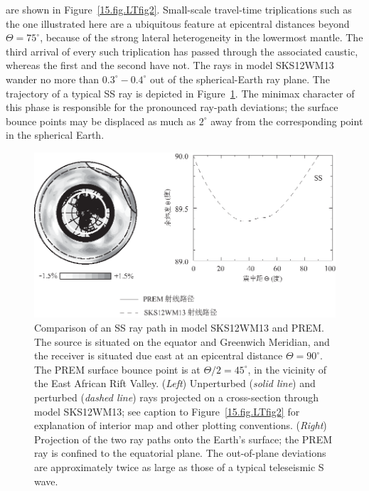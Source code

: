 are shown in Figure~\ref{15.fig.LTfig2}.  Small-scale travel-time
triplications such as the one illustrated here are a ubiquitous
feature at epicentral distances beyond $\Theta=75^{\circ}$,
because of the strong lateral heterogeneity in the lowermost
mantle.  The third arrival of every such triplication has
passed through the associated caustic, whereas the first and
the second have not.  The rays in model SKS12WM13 wander no more
than $0.3^{\circ}\!\!-\!0.4^{\circ}$ out of the spherical-Earth
ray plane.
The trajectory of a typical SS ray is depicted
in Figure~\ref{15.fig.LTfig13}.  The minimax character
%
%
of this phase is responsible for the pronounced ray-path
deviations; the surface bounce points may be displaced as
much as $2^{\circ}$ away from the corresponding point
in the spherical Earth.
\begin{figure}[!t]
\begin{center}
\includegraphics{../figures/chap15/fig07.eps}
\end{center}
\caption[liu&tromp Fig 13]
{\label{15.fig.LTfig13}
Comparison of an SS ray path in model SKS12WM13 and PREM.
The source is situated on the equator and Greenwich Meridian,
and the receiver is situated due east at an epicentral distance
$\Theta=90^{\circ}$.  The PREM surface bounce point is at
$\Theta/2=45^{\circ}$, in the vicinity of the East African Rift Valley.
({\em Left\/}) Unperturbed ({\em solid line\/}) and perturbed
({\em dashed line\/}) rays projected on a cross-section through model
SKS12WM13; see caption to Figure~\ref{15.fig.LTfig2} for explanation
of interior map and other plotting conventions.
({\em Right\/}) Projection of the two ray paths
onto the Earth's surface; the PREM ray is confined to the equatorial plane.
The out-of-plane deviations are approximately twice as large as those
of a typical teleseismic S wave.}
\end{figure}
%
%

